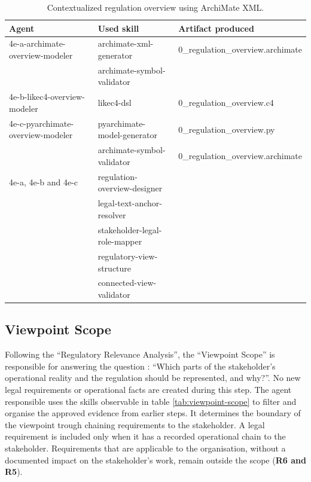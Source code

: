 \begin{table}[h]
\centering
\small
\begin{tabular}{p{5.2cm} p{5.5cm} p{3.5cm}}
\hline
\textbf{Agent} & \textbf{Used skill} & \textbf{Artifact produced} \\
\hline
4e-a-archimate-overview-modeler & archimate-xml-generator & 0\_regulation\_overview.archimate \\
 & archimate-symbol-validator &  \\
\hline
4e-b-likec4-overview-modeler & likec4-dsl & 0\_regulation\_overview.c4 \\
\hline
4e-c-pyarchimate-overview-modeler & pyarchimate-model-generator & 0\_regulation\_overview.py\\
 & archimate-symbol-validator & 0\_regulation\_overview.archimate  \\
\hline
 4e-a, 4e-b and 4e-c& regulation-overview-designer &  \\
 & legal-text-anchor-resolver &  \\
 & stakeholder-legal-role-mapper &  \\
 & regulatory-view-structure &  \\
 & connected-view-validator &  \\
\hline
\end{tabular}
\caption{Contextualized regulation overview using ArchiMate XML.}
\label{tab:regulation-overview-archimate}
\end{table}

\subsection{Viewpoint Scope}
\label{vpScope}

Following the ``Regulatory Relevance Analysis'', the ``Viewpoint Scope'' is responsible for answering the question : ``Which parts of the stakeholder’s operational reality and the regulation should be represented, and why?''. No new legal requirements or operational facts are created during this step. The agent responsible uses the skills observable in table \ref{tab:viewpoint-scope} to filter and organise the approved evidence from earlier steps. It determines the boundary of the viewpoint trough chaining requirements to the stakeholder. A legal requirement is included only when it has a recorded operational chain to the stakeholder. Requirements that are applicable to the organisation, without a documented impact on the stakeholder's work, remain outside the scope (\textbf{R6 and R5}).


